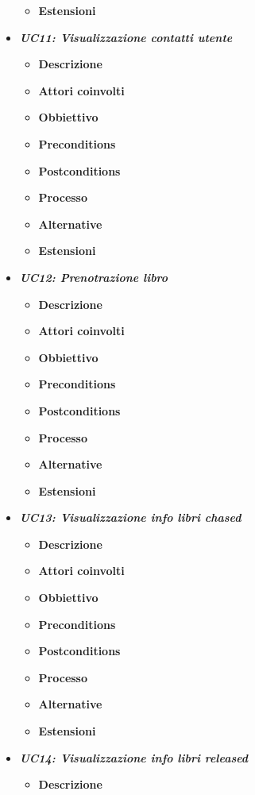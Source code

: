 \begin{itemize}
\begin{itemize}
		\item \textbf{Estensioni}
	\end{itemize}
	\item \textbf{\textit{UC11: Visualizzazione contatti utente}}
	\begin{itemize}
		\item \textbf{Descrizione}
		\item \textbf{Attori coinvolti}
		\item \textbf{Obbiettivo}
		\item \textbf{Preconditions}
		\item \textbf{Postconditions}
		\item \textbf{Processo}
		\item \textbf{Alternative}
		\item \textbf{Estensioni}
	\end{itemize}
	\item \textbf{\textit{UC12: Prenotrazione libro}}
	\begin{itemize}
		\item \textbf{Descrizione}
		\item \textbf{Attori coinvolti}
		\item \textbf{Obbiettivo}
		\item \textbf{Preconditions}
		\item \textbf{Postconditions}
		\item \textbf{Processo}
		\item \textbf{Alternative}
		\item \textbf{Estensioni}
	\end{itemize}
	\item \textbf{\textit{UC13: Visualizzazione info libri chased}}
	\begin{itemize}
		\item \textbf{Descrizione}
		\item \textbf{Attori coinvolti}
		\item \textbf{Obbiettivo}
		\item \textbf{Preconditions}
		\item \textbf{Postconditions}
		\item \textbf{Processo}
		\item \textbf{Alternative}
		\item \textbf{Estensioni}
	\end{itemize}
	\item \textbf{\textit{UC14: Visualizzazione info libri released}}
	\begin{itemize}
		\item \textbf{Descrizione}

\end{itemize}
\end{itemize}
